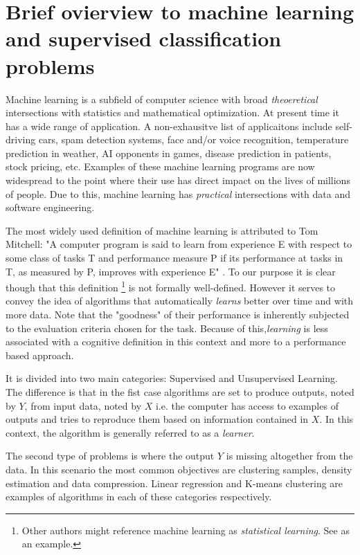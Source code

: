 
\section{ Brief ovierview to machine learning and supervised classification problems}\label{section-introduction}

Machine learning is a subfield of computer science with broad \textit{theoeretical} intersections with statistics and mathematical optimization. At present time it has a wide range of application. A non-exhausitve list of applicaitons include self-driving cars, spam detection systems, face and/or voice recognition, temperature prediction in weather, AI opponents in games, disease prediction in patients, stock pricing, etc. Examples of these machine learning programs are now widespread to the point where their use has direct impact on the lives of millions of people. Due to this, machine learning has \textit{practical} intersections with data and software engineering.

The most widely used definition of machine learning is attributed to Tom Mitchell: 	 
"A computer program is said to learn from experience E with respect to some class of tasks T and performance measure P if its performance at tasks in T, as measured by P, improves with experience E" \cite{Mitchell-MLearning}. To our purpose it is clear though that this definition \footnote{Other authors might reference machine learning as \textit{statistical learning}. See \cite{hastie-elemstatslearn} as an example.} is not formally well-defined. However it serves to convey the idea of algorithms that automatically \textit{learns} better over time and with more data. Note that the "goodness" of their performance is inherently subjected to the evaluation criteria chosen for the task. Because of this,\textit{learning} is less associated with a cognitive definition in this context and more to a performance based approach.

It is divided into two main categories: Supervised and Unsupervised Learning. The difference is that in the fist case algorithms are set to produce outputs, noted by $Y$, from input data, noted by $X$ i.e. the computer has access to examples of outputs and tries to reproduce them based on information contained in $X$. In this context, the algorithm is generally referred to as a \textit{learner}.

The second type of problems is where the output $Y$ is missing altogether from the data. In this scenario the most common objectives are clustering samples, density estimation and data compression. Linear regression and K-means clustering are examples of algorithms in each of these categories respectively.

